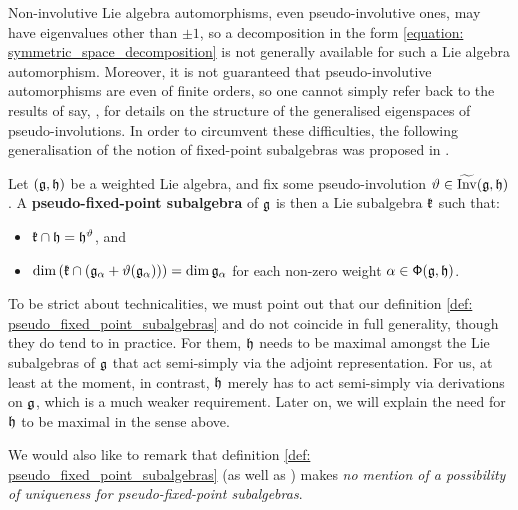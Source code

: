         Non-involutive Lie algebra automorphisms, even pseudo-involutive ones, may have eigenvalues other than $\pm 1$, so a decomposition in the form \eqref{equation: symmetric_space_decomposition} is not generally available for such a Lie algebra automorphism. Moreover, it is not guaranteed that pseudo-involutive automorphisms are even of finite orders, so one cannot simply refer back to the results of say, \cite[Chapter 8]{kac_infinite_dimensional_lie_algebras}, for details on the structure of the generalised eigenspaces of pseudo-involutions. In order to circumvent these difficulties, the following generalisation of the notion of fixed-point subalgebras was proposed in \cite[Definition 1.2]{regelskis_vlaar_kac_moody_pseudo_symmetric_pairs}. 
        \begin{definition} \label{def: pseudo_fixed_point_subalgebras}
            Let $(\mathfrak{g}, \mathfrak{h})$ be a weighted Lie algebra, and fix some pseudo-involution $\vartheta \in \widetilde{\operatorname{Inv}}(\mathfrak{g}, \mathfrak{h})$. A \textbf{pseudo-fixed-point subalgebra} of $\mathfrak{g}$ is then a Lie subalgebra $\mathfrak{k}$ such that:
            \begin{itemize}
                \item $\mathfrak{k} \cap \mathfrak{h} = \mathfrak{h}^{\vartheta}$, and
                \item $\dim\left( \mathfrak{k} \cap ( \mathfrak{g}_{\alpha} + \vartheta(\mathfrak{g}_{\alpha}) ) \right) = \dim \mathfrak{g}_{\alpha}$ for each non-zero weight $\alpha \in \mathsf{\Phi}(\mathfrak{g}, \mathfrak{h})$.
            \end{itemize}
        \end{definition}
        \begin{remark}
            To be strict about technicalities, we must point out that our definition \eqref{def: pseudo_fixed_point_subalgebras} and \cite[Definition 1.2]{regelskis_vlaar_kac_moody_pseudo_symmetric_pairs} do not coincide in full generality, though they do tend to in practice. For them, $\mathfrak{h}$ needs to be maximal amongst the Lie subalgebras of $\mathfrak{g}$ that act semi-simply via the adjoint representation. For us, at least at the moment, in contrast, $\mathfrak{h}$ merely has to act semi-simply via derivations on $\mathfrak{g}$, which is a much weaker requirement. Later on, we will explain the need for $\mathfrak{h}$ to be maximal in the sense above.
            
            We would also like to remark that definition \ref{def: pseudo_fixed_point_subalgebras} (as well as \cite[Definition 1.2]{regelskis_vlaar_kac_moody_pseudo_symmetric_pairs}) makes \textit{no mention of a possibility of uniqueness for pseudo-fixed-point subalgebras}.
        \end{remark}

